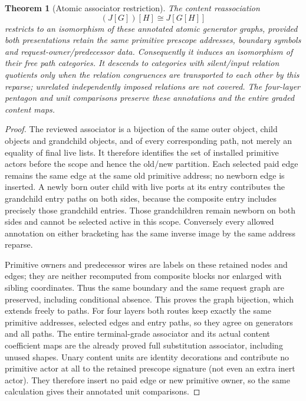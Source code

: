 \documentclass[11pt]{article}
\newtheorem{theorem}{Theorem}\newtheorem{proposition}{Proposition}
\begin{document}
\begin{theorem}[Atomic associator restriction]
The content reassociation
\[
                 (J[G])[H]\cong J[G[H]]
\]
restricts to an isomorphism of these annotated atomic generator graphs, provided both presentations retain the same primitive prescope addresses, boundary symbols and request-owner/predecessor data. Consequently it induces an isomorphism of their free path categories. It descends to categories with silent/input relation quotients only when the relation congruences are transported to each other by this reparse; unrelated independently imposed relations are not covered. The four-layer pentagon and unit comparisons preserve these annotations and the entire graded content maps.
\end{theorem}
\begin{proof}
The reviewed associator is a bijection of the same outer object, child objects and grandchild objects, and of every corresponding path, not merely an equality of final live lists. It therefore identifies the set of installed primitive actors before the scope and hence the old/new partition. Each selected paid edge remains the same edge at the same old primitive address; no newborn edge is inserted. A newly born outer child with live ports at its entry contributes the grandchild entry paths on both sides, because the composite entry includes precisely those grandchild entries. Those grandchildren remain newborn on both sides and cannot be selected active in this scope. Conversely every allowed annotation on either bracketing has the same inverse image by the same address reparse.

Primitive owners and predecessor wires are labels on these retained nodes and edges; they are neither recomputed from composite blocks nor enlarged with sibling coordinates. Thus the same boundary and the same request graph are preserved, including conditional absence. This proves the graph bijection, which extends freely to paths. For four layers both routes keep exactly the same primitive addresses, selected edges and entry paths, so they agree on generators and all paths. The entire terminal-grade associator and its actual content coefficient maps are the already proved full substitution associator, including unused shapes. Unary content units are identity decorations and contribute no primitive actor at all to the retained prescope signature (not even an extra inert actor). They therefore insert no paid edge or new primitive owner, so the same calculation gives their annotated unit comparisons.\end{proof}
\end{document}
